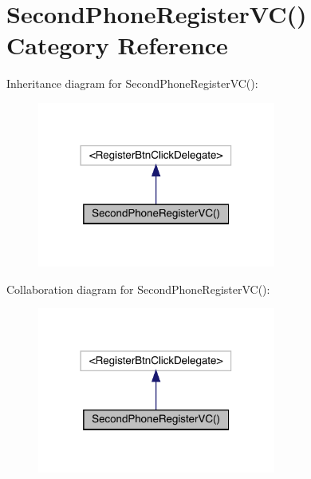\hypertarget{category_second_phone_register_v_c_07_08}{}\section{Second\+Phone\+Register\+VC() Category Reference}
\label{category_second_phone_register_v_c_07_08}


Inheritance diagram for Second\+Phone\+Register\+VC()\+:\nopagebreak
\begin{figure}[H]
\begin{center}
\leavevmode
\includegraphics[width=222pt]{category_second_phone_register_v_c_07_08__inherit__graph}
\end{center}
\end{figure}


Collaboration diagram for Second\+Phone\+Register\+VC()\+:\nopagebreak
\begin{figure}[H]
\begin{center}
\leavevmode
\includegraphics[width=222pt]{category_second_phone_register_v_c_07_08__coll__graph}
\end{center}
\end{figure}
